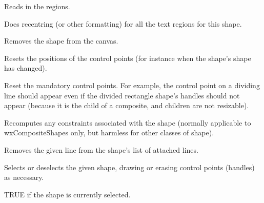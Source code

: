 Reads in the regions.



Does recentring (or other formatting) for all the text regions for this shape.



Removes the shape from the canvas.



Resets the positions of the control points (for instance when the
shape's shape has changed).



Reset the mandatory control points. For example, the control point on a dividing line should
appear even if the divided rectangle shape's handles should not appear (because it is the child of
a composite, and children are not resizable).

\label{wxshaperecompute}


Recomputes any constraints associated with the shape (normally
applicable to wxCompositeShapes only, but harmless for other
classes of shape).



Removes the given line from the shape's list of attached lines.

\label{wxshapeselect}


Selects or deselects the given shape, drawing or erasing control points
(handles) as necessary.

\label{wxshapeselected}


TRUE if the shape is currently selected.

\label{wxshapesetattachmentmode}

